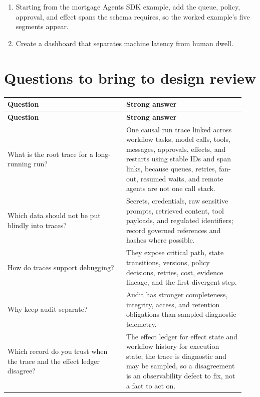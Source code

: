 \begin{enumerate}

\item Starting from the mortgage Agents SDK example, add the queue, policy, approval, and effect spans the schema requires, so the worked example's five segments appear.

\item Create a dashboard that separates machine latency from human dwell.

\end{enumerate}

\section{Questions to bring to design review}

\BookTableStart
\small
\begin{longtable}{@{}Y{0.4700\linewidth}Y{0.4700\linewidth}@{}}
\color{white}\bfseries \textbf{Question} & \color{white}\bfseries \textbf{Strong answer} \\
\endfirsthead
{}
\color{white}\bfseries \textbf{Question} & \color{white}\bfseries \textbf{Strong answer} \\
\endhead
What is the root trace for a long-running run? & One causal run trace linked across workflow tasks, model calls, tools, messages, approvals, effects, and restarts using stable IDs and span links, because queues, retries, fan-out, resumed waits, and remote agents are not one call stack. \\
Which data should not be put blindly into traces? & Secrets, credentials, raw sensitive prompts, retrieved content, tool payloads, and regulated identifiers; record governed references and hashes where possible. \\
How do traces support debugging? & They expose critical path, state transitions, versions, policy decisions, retries, cost, evidence lineage, and the first divergent step. \\
Why keep audit separate? & Audit has stronger completeness, integrity, access, and retention obligations than sampled diagnostic telemetry. \\
Which record do you trust when the trace and the effect ledger disagree? & The effect ledger for effect state and workflow history for execution state; the trace is diagnostic and may be sampled, so a disagreement is an observability defect to fix, not a fact to act on. \\
\end{longtable}
\BookTableEnd


